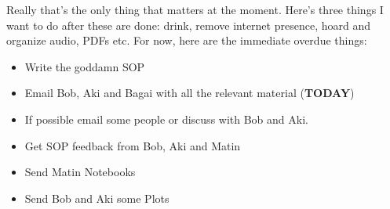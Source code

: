 \noindent {}

Really that's the only thing that matters at the moment. Here's three things I want to do after these are done: drink, remove internet presence, hoard and organize audio, PDFs etc. For now, here are the immediate overdue things:
\begin{itemize}
    \item Write the goddamn SOP
    \item Email Bob, Aki and Bagai with all the relevant material (\textbf{TODAY})
    \item If possible email some people or discuss with Bob and Aki. 
    \item Get SOP feedback from Bob, Aki and Matin
    \item Send Matin Notebooks
    \item Send Bob and Aki some Plots
\end{itemize}
